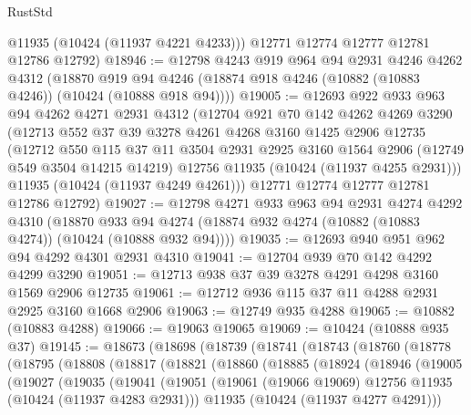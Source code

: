\begin{lexlean}{RustStd}
\begin{coremodule}
        @11935
        (@10424 (@11937 @4221 @4233)))
      @12771
      @12774
      @12777
      @12781
      @12786
      @12792)
@18946 := @12798
    @4243
    @919
    @964
    @94
    @2931
    @4246
    @4262
    @4312
    (@18870 @919 @94 @4246 (@18874 @918 @4246 (@10882 (@10883 @4246)) (@10424 (@10888 @918 @94))))
@19005 := @12693
    @922
    @933
    @963
    @94
    @4262
    @4271
    @2931
    @4312
    (@12704
      @921
      @70
      @142
      @4262
      @4269
      @3290
      (@12713
        @552
        @37
        @39
        @3278
        @4261
        @4268
        @3160
        @1425
        @2906
        @12735
        (@12712
          @550
          @115
          @37
          @11
          @3504
          @2931
          @2925
          @3160
          @1564
          @2906
          (@12749 @549 @3504 @14215 @14219)
          @12756
          @11935
          (@10424 (@11937 @4255 @2931)))
        @11935
        (@10424 (@11937 @4249 @4261)))
      @12771
      @12774
      @12777
      @12781
      @12786
      @12792)
@19027 := @12798
    @4271
    @933
    @963
    @94
    @2931
    @4274
    @4292
    @4310
    (@18870 @933 @94 @4274 (@18874 @932 @4274 (@10882 (@10883 @4274)) (@10424 (@10888 @932 @94))))
@19035 := @12693 @940 @951 @962 @94 @4292 @4301 @2931 @4310
@19041 := @12704 @939 @70 @142 @4292 @4299 @3290
@19051 := @12713 @938 @37 @39 @3278 @4291 @4298 @3160 @1569 @2906 @12735
@19061 := @12712 @936 @115 @37 @11 @4288 @2931 @2925 @3160 @1668 @2906
@19063 := @12749 @935 @4288
@19065 := @10882 (@10883 @4288)
@19066 := @19063 @19065
@19069 := @10424 (@10888 @935 @37)
@19145 := @18673
    (@18698
      (@18739
        (@18741
          (@18743
            (@18760
              (@18778
                (@18795
                  (@18808
                    (@18817
                      (@18821
                        (@18860
                          (@18885
                            (@18924
                              (@18946
                                (@19005
                                  (@19027
                                    (@19035
                                      (@19041
                                        (@19051
                                          (@19061
                                            (@19066 @19069)
                                            @12756
                                            @11935
                                            (@10424 (@11937 @4283 @2931)))
                                          @11935
                                          (@10424 (@11937 @4277 @4291)))

\end{coremodule}
\end{lexlean}
